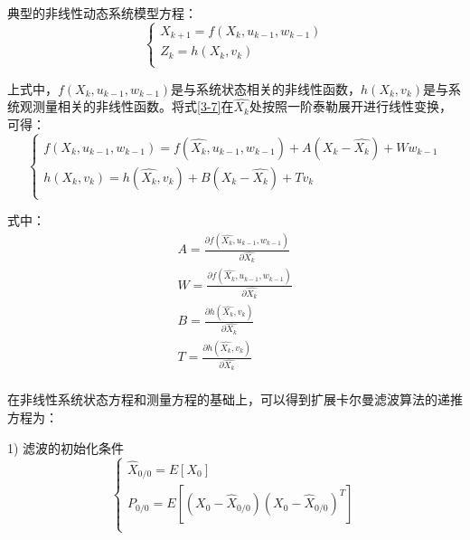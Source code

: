 典型的非线性动态系统模型方程：
\begin{equation}\label{3-7}
\left\{ \begin{array}{l}
   {{X}_{k+1}}=f\left( {{X}_{k}},{{u}_{k-1}},{{w}_{k-1}} \right) \\ 
  {{Z}_{k}}=h\left( {{X}_{k}},{{v}_{k}} \right) \\ 
\end{array} \right.
\end{equation}

上式中，$f\left( {{X}_{k}},{{u}_{k-1}},{{w}_{k-1}} \right)$是与系统状态相关的非线性函数，$h\left( {{X}_{k}},{{v}_{k}} \right)$是与系统观测量相关的非线性函数。将式\ref{3-7}在$\widehat{{{X}_{k}}}$处按照一阶泰勒展开进行线性变换，可得：
\begin{equation}
\left\{ \begin{array}{l}
  f\left( {{X}_{k}},{{u}_{k-1}},{{w}_{k-1}} \right)=f\left( \widehat{{{X}_{k}}},{{u}_{k-1}},{{w}_{k-1}} \right)+A\left( {{X}_{k}}-\widehat{{{X}_{k}}} \right)+W{{w}_{k-1}} \\ 
 h\left( {{X}_{k}},{{v}_{k}} \right)=h\left( \widehat{{{X}_{k}}},{{v}_{k}} \right)+B\left( {{X}_{k}}-\widehat{{{X}_{k}}} \right)+T{{v}_{k}} \\ 
\end{array} \right.
\end{equation}

式中：
\begin{equation}
\begin{array}{l}
   A=\frac{\partial f\left( \widehat{{{X}_{k}}},{{u}_{k-1}},{{w}_{k-1}} \right)}{\partial \widehat{{{X}_{k}}}} \\ 
 W=\frac{\partial f\left( \widehat{{{X}_{k}}},{{u}_{k-1}},{{w}_{k-1}} \right)}{\partial \widehat{{{X}_{k}}}} \\ 
  B=\frac{\partial h\left( \widehat{{{X}_{k}}},{{v}_{k}} \right)}{\partial \widehat{{{X}_{k}}}} \\ 
  T=\frac{\partial h\left( \widehat{{{X}_{k}}},{{v}_{k}} \right)}{\partial \widehat{{{X}_{k}}}} \\ 
\end{array}
\end{equation}

在非线性系统状态方程和测量方程的基础上，可以得到扩展卡尔曼滤波算法的递推方程为：

1) 滤波的初始化条件
\begin{equation}
\left\{ \begin{array}{l}
   {{\widehat{X}}_{0/0}}=E\left[ {{X}_{0}} \right] \\ 
  {{P}_{0/0}}=E\left[ \left( {{X}_{0}}-{{\widehat{X}}_{0/0}} \right){{\left( {{X}_{0}}-{{\widehat{X}}_{0/0}} \right)}^{T}} \right] \\ 
\end{array} \right.
\end{equation}

